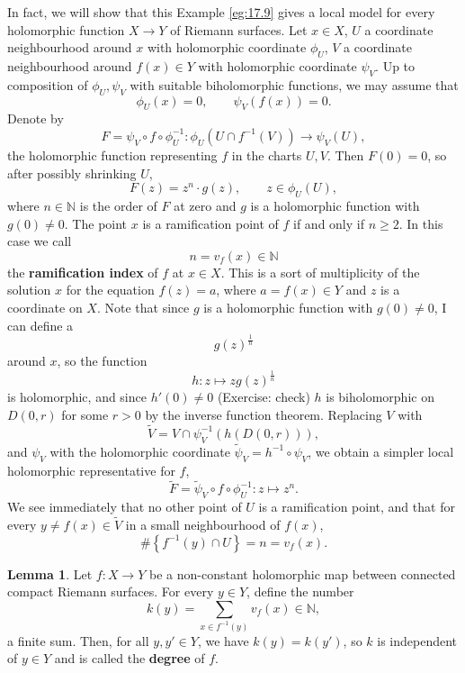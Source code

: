 \documentclass{article}
\newcommand{\N}{\mathbb{N}}
\newcommand{\rb}[1]{\left( #1 \right)}
\newcommand{\cb}[1]{\left\{ #1 \right\}}
\theoremstyle{definition}\newtheorem{definition}{Definition}[section]
\theoremstyle{definition}\newtheorem{notation}[definition]{Notation}
\theoremstyle{definition}\newtheorem{remark}[definition]{Remark}
\theoremstyle{definition}\newtheorem{example1}[definition]{Example}
\theoremstyle{definition}\newtheorem{fact}{Fact}
\theoremstyle{definition}\newtheorem{exercise}{Exercise}
\theoremstyle{definition}\newtheorem*{example2}{Example}
\newtheorem{lemma}[definition]{Lemma}
\begin{document}
In fact, we will show that this Example \ref{eg:17.9} gives a local model for every holomorphic function $ X \to Y $ of Riemann surfaces. Let $ x \in X $, $ U $ a coordinate neighbourhood around $ x $ with holomorphic coordinate $ \phi_U $, $ V $ a coordinate neighbourhood around $ f\rb{x} \in Y $ with holomorphic coordinate $ \psi_V $. Up to composition of $ \phi_U, \psi_V $ with suitable biholomorphic functions, we may assume that
$$ \phi_U\rb{x} = 0, \qquad \psi_V\rb{f\rb{x}} = 0. $$
Denote by
$$ F = \psi_V \circ f \circ \phi_U^{-1} : \phi_U\rb{U \cap f^{-1}\rb{V}} \to \psi_V\rb{U}, $$
the holomorphic function representing $ f $ in the charts $ U, V $. Then $ F\rb{0} = 0 $, so after possibly shrinking $ U $,
$$ F\rb{z} = z^n \cdot g\rb{z}, \qquad z \in \phi_U\rb{U}, $$
where $ n \in \N $ is the order of $ F $ at zero and $ g $ is a holomorphic function with $ g\rb{0} \ne 0 $. The point $ x $ is a ramification point of $ f $ if and only if $ n \ge 2 $. In this case we call
$$ n = v_f\rb{x} \in \N $$
the \textbf{ramification index} of $ f $ at $ x \in X $. This is a sort of multiplicity of the solution $ x $ for the equation $ f\rb{z} = a $, where $ a = f\rb{x} \in Y $ and $ z $ is a coordinate on $ X $. Note that since $ g $ is a holomorphic function with $ g\rb{0} \ne 0 $, I can define a
$$ g\rb{z}^{\tfrac{1}{n}} $$
around $ x $, so the function
$$ h : z \mapsto zg\rb{z}^{\tfrac{1}{n}} $$
is holomorphic, and since $ h'\rb{0} \ne 0 $ (Exercise: check) $ h $ is biholomorphic on $ D\rb{0, r} $ for some $ r > 0 $ by the inverse function theorem. Replacing $ V $ with
$$ \widetilde{V} = V \cap \psi_V^{-1}\rb{h\rb{D\rb{0, r}}}, $$
and $ \psi_V $ with the holomorphic coordinate $ \widetilde{\psi}_V = h^{-1} \circ \psi_V $, we obtain a simpler local holomorphic representative for $ f $,
$$ \widetilde{F} = \widetilde{\psi}_V \circ f \circ \phi_U^{-1} : z \mapsto z^n. $$
We see immediately that no other point of $ U $ is a ramification point, and that for every $ y \ne f\rb{x} \in \widetilde{V} $ in a small neighbourhood of $ f\rb{x} $,
$$ \#\cb{f^{-1}\rb{y} \cap U} = n = v_f\rb{x}. $$

\begin{lemma}
Let $ f : X \to Y $ be a non-constant holomorphic map between connected compact Riemann surfaces. For every $ y \in Y $, define the number
$$ k\rb{y} = \sum_{x \in f^{-1}\rb{y}} v_f\rb{x} \in \N, $$
a finite sum. Then, for all $ y, y' \in Y $, we have $ k\rb{y} = k\rb{y'} $, so $ k $ is independent of $ y \in Y $ and is called the \textbf{degree} of $ f $.
\end{lemma}
\end{document}
